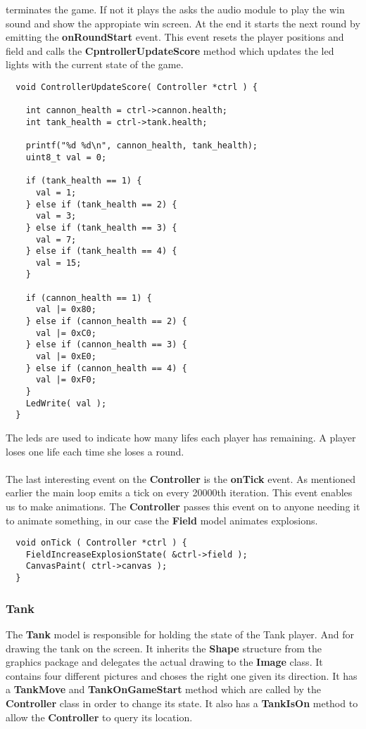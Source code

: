 terminates the game. If not it plays the asks the audio module to play the win sound and show the
appropiate win screen. At the end it starts the next round by emitting the {\bf onRoundStart} event.
This event resets the player positions and field and calls the {\bf CpntrollerUpdateScore} method
which updates the led lights with the current state of the game.
\begin{lstlisting}
  void ControllerUpdateScore( Controller *ctrl ) {

    int cannon_health = ctrl->cannon.health;
    int tank_health = ctrl->tank.health;

    printf("%d %d\n", cannon_health, tank_health);
    uint8_t val = 0;

    if (tank_health == 1) {
      val = 1;
    } else if (tank_health == 2) {
      val = 3;
    } else if (tank_health == 3) {
      val = 7;
    } else if (tank_health == 4) {
      val = 15;
    }

    if (cannon_health == 1) {
      val |= 0x80;
    } else if (cannon_health == 2) {
      val |= 0xC0;
    } else if (cannon_health == 3) {
      val |= 0xE0;
    } else if (cannon_health == 4) {
      val |= 0xF0;
    }
    LedWrite( val );
  }
\end{lstlisting}
The leds are used to indicate how many lifes each player has remaining. A player loses one life each
time she loses a round.\\
\\
The last interesting event on the {\bf Controller} is the {\bf onTick} event. As mentioned earlier
the main loop emits a tick on every 20000th iteration. This event enables us to make animations.
The {\bf Controller} passes this event on to anyone needing it to animate something, in our case the
{\bf Field} model animates explosions.
\begin{lstlisting}
  void onTick ( Controller *ctrl ) {
    FieldIncreaseExplosionState( &ctrl->field );
    CanvasPaint( ctrl->canvas );
  }
\end{lstlisting}

\subsubsection{Tank}
The {\bf Tank} model is responsible for holding the state of the Tank player. And for drawing the
tank on the screen. It inherits the {\bf Shape} structure from the graphics package and delegates
the actual drawing to the {\bf Image} class. It contains four different pictures and choses the
right one given its direction. It has a {\bf TankMove} and {\bf TankOnGameStart} method which are
called by the {\bf Controller} class in order to change its state. It also has a {\bf TankIsOn}
method to allow the {\bf Controller} to query its location.

